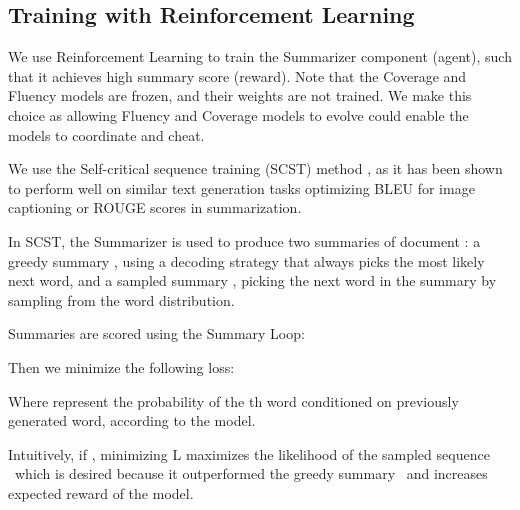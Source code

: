 \documentclass[11pt,a4paper]{article}
\begin{document}
\subsection{Training with Reinforcement Learning}
We use Reinforcement Learning to train the Summarizer component (agent), such that it achieves high summary score (reward). Note that the Coverage and Fluency models are frozen, and their weights are not trained. We make this choice as allowing Fluency and Coverage models to evolve could enable the models to coordinate and cheat.

We use the Self-critical sequence training (SCST) method \cite{rennie2017self}, as it has been shown to perform well on similar text generation tasks optimizing BLEU for image captioning or ROUGE scores in summarization.

In SCST, the Summarizer is used to produce two summaries of document : a greedy summary , using a decoding strategy that always picks the most likely next word, and a sampled summary , picking the next word in the summary by sampling from the word distribution.

Summaries are scored using the Summary Loop:



Then we minimize the following loss:

Where  represent the probability of the th word conditioned on previously generated word, according to the model.

Intuitively, if , minimizing L maximizes the likelihood of the sampled sequence \textemdash~which is desired because it outperformed the greedy summary \textemdash~and increases expected reward of the model. 
\end{document}
